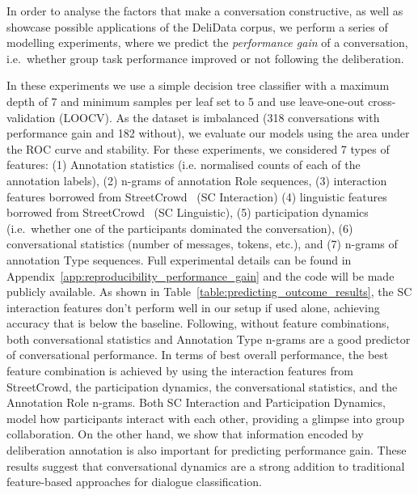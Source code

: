 \documentclass[acmsmall,manuscript,screen]{acmart}
\newcommand\delidata{DeliData }
\begin{document}
In order to analyse the factors that make a conversation constructive, as well as showcase possible applications of the \delidata corpus, we perform a series of modelling experiments, where we predict the \textit{performance gain} of a conversation, i.e.\ whether group task performance improved or not following the deliberation.

In these experiments we use a simple decision tree classifier \cite{scikit-learn} with a maximum depth of 7 and minimum samples per leaf set to 5 and use leave-one-out cross-validation (LOOCV).
As the dataset is imbalanced (318 conversations with performance gain and 182 without),
we evaluate our models using the area under the ROC curve and stability. For these experiments, we considered 7 types of features: (1) Annotation statistics (i.e. normalised counts of each of the annotation labels), (2) n-grams of annotation Role sequences, (3) interaction features borrowed from StreetCrowd~\cite{niculae2016conversational} (SC Interaction) (4) linguistic features borrowed from StreetCrowd~\cite{niculae2016conversational} (SC Linguistic), (5) participation dynamics (i.e.\ whether one of the participants dominated the conversation),  (6) conversational statistics (number of messages, tokens, etc.), and (7) n-grams of annotation Type sequences. Full experimental details can be found in Appendix~\ref{app:reproducibility_performance_gain} and the code will be made publicly available.
As shown in Table~\ref{table:predicting_outcome_results}, the SC interaction features don't perform well in our setup if used alone, achieving accuracy that is below the baseline. Following, without feature combinations, both conversational statistics and Annotation Type n-grams are a good predictor of conversational performance. In terms of best overall performance, the best feature combination is achieved by using the interaction features from StreetCrowd, the participation dynamics, the conversational statistics, and the Annotation Role n-grams. Both SC Interaction and Participation Dynamics, model how participants interact with each other, providing a glimpse into group collaboration. On the other hand, we show that information encoded by deliberation annotation is also important for predicting performance gain. These results suggest that conversational dynamics are a strong addition to traditional feature-based approaches for dialogue classification.
\end{document}
